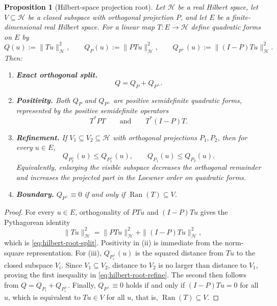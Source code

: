 \documentclass[11pt,a4paper]{article}
\numberwithin{equation}{section}
\DeclareMathOperator{\Ran}{Ran}
\theoremstyle{thmcompact}
\newtheorem{proposition}[theorem]{Proposition}
\theoremstyle{remark}
\begin{document}
\begin{proposition}[Hilbert-space projection root]\label{prop:hilbert-root}
Let $\mathcal{H}$ be a real Hilbert space, let $V \subseteq \mathcal{H}$ be a closed subspace with orthogonal projection $P$, and let $E$ be a finite-dimensional real Hilbert space. For a linear map $T : E \to \mathcal{H}$ define quadratic forms on $E$ by
\begin{equation}\label{eq:hilbert-root-def}
Q(u) := \|Tu\|_{\mathcal{H}}^2, \qquad
Q_P(u) := \|PTu\|_{\mathcal{H}}^2, \qquad
Q_{P^\perp}(u) := \|(I-P)Tu\|_{\mathcal{H}}^2.
\end{equation}
Then:
\begin{enumerate}[label=\textup{(\roman*)}]
\item \textbf{Exact orthogonal split.}
\begin{equation}\label{eq:hilbert-root-split}
Q = Q_P + Q_{P^\perp}.
\end{equation}

\item \textbf{Positivity.} Both $Q_P$ and $Q_{P^\perp}$ are positive semidefinite quadratic forms, represented by the positive semidefinite operators
\[
T^*PT \qquad \text{and} \qquad T^*(I-P)T.
\]

\item \textbf{Refinement.} If $V_1 \subseteq V_2 \subseteq \mathcal{H}$ with orthogonal projections $P_1,P_2$, then for every $u \in E$,
\begin{equation}\label{eq:hilbert-root-refine}
Q_{P_2^\perp}(u) \le Q_{P_1^\perp}(u), \qquad
Q_{P_1}(u) \le Q_{P_2}(u).
\end{equation}
Equivalently, enlarging the visible subspace decreases the orthogonal remainder and increases the projected part in the Loewner order on quadratic forms.

\item \textbf{Boundary.} $Q_{P^\perp} \equiv 0$ if and only if $\Ran(T) \subseteq V$.
\end{enumerate}
\end{proposition}

\begin{proof}
For every $u \in E$, orthogonality of $PTu$ and $(I-P)Tu$ gives the Pythagorean identity
\[
\|Tu\|_{\mathcal{H}}^2 = \|PTu\|_{\mathcal{H}}^2 + \|(I-P)Tu\|_{\mathcal{H}}^2,
\]
which is \eqref{eq:hilbert-root-split}. Positivity in (ii) is immediate from the norm-square representation. For (iii), $Q_{P_i^\perp}(u)$ is the squared distance from $Tu$ to the closed subspace $V_i$. Since $V_1 \subseteq V_2$, distance to $V_2$ is no larger than distance to $V_1$, proving the first inequality in \eqref{eq:hilbert-root-refine}. The second then follows from $Q = Q_{P_i} + Q_{P_i^\perp}$. Finally, $Q_{P^\perp} \equiv 0$ holds if and only if $(I-P)Tu = 0$ for all $u$, which is equivalent to $Tu \in V$ for all $u$, that is, $\Ran(T) \subseteq V$.
\end{proof}
\end{document}
